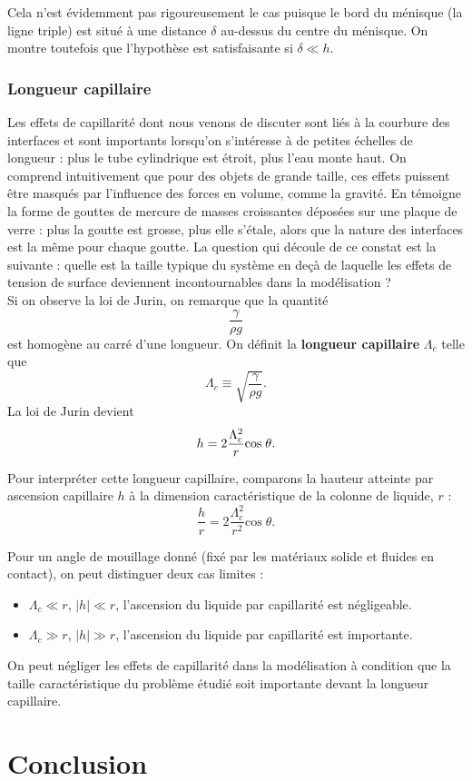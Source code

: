 \documentclass[11pt,a4paper]{report}
\begin{document}
Cela n'est évidemment pas rigoureusement le cas puisque le bord du ménisque (la ligne triple) est situé à une distance $\delta$ au-dessus du centre du ménisque. On montre toutefois que l'hypothèse est satisfaisante si $\delta \ll h$.





\subsubsection*{Longueur capillaire}

Les effets de capillarité dont nous venons de discuter sont liés à la courbure des interfaces et sont importants lorsqu'on s'intéresse à de petites échelles de longueur : plus le tube cylindrique est étroit, plus l'eau monte haut. On comprend intuitivement que pour des objets de grande taille, ces effets puissent être masqués par l'influence des forces en volume, comme la gravité. En témoigne la forme de gouttes de mercure de masses croissantes déposées sur une plaque de verre : plus la goutte est grosse, plus elle s'étale, alors que la nature des interfaces est la même pour chaque goutte. La question qui découle de ce constat est la suivante : quelle est la taille typique du système en deçà de laquelle les effets de tension de surface deviennent incontournables dans la modélisation ?\\

Si on observe la loi de Jurin, on remarque que la quantité
\begin{equation}
	\frac{\gamma}{\rho g}
\end{equation}
est homogène au carré d'une longueur. On définit la \textbf{longueur capillaire} $\Lambda_c$ telle que
\begin{equation}
	\boxed{\Lambda_c \equiv \sqrt{\frac{\gamma}{\rho g}}}.
\end{equation}
La loi de Jurin devient
\begin{equation}
	h = 2 \frac{\Lambda_c^2}{r}\text{cos}\;\theta.\\
\end{equation}

Pour interpréter cette longueur capillaire, comparons la hauteur atteinte par ascension capillaire $h$ à la dimension caractéristique de la colonne de liquide, $r$ :
\begin{equation}
	\frac{h}{r} = 2 \frac{\Lambda_c^2}{r^2}\text{cos}\;\theta.
\end{equation}

Pour un angle de mouillage donné (fixé par les matériaux solide et fluides en contact), on peut distinguer deux cas limites :
\begin{itemize}
	\item $\Lambda_c \ll r$, $|h| \ll r$, l'ascension du liquide par capillarité est négligeable.
	\item $\Lambda_c \gg r$, $|h| \gg r$, l'ascension du liquide par capillarité est importante.
\end{itemize}
On peut négliger les effets de capillarité dans la modélisation à condition que la taille caractéristique du problème étudié soit importante devant la longueur capillaire.

\section*{Conclusion}
\end{document}
